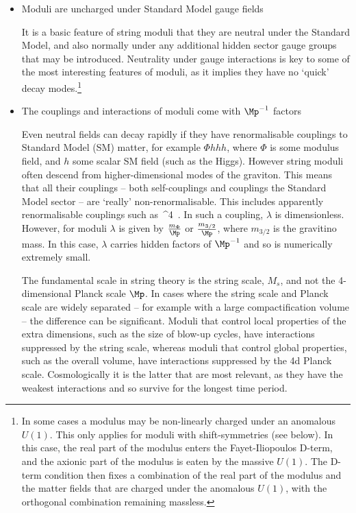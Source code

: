 \begin{itemize}

\item{Moduli are uncharged under Standard Model gauge fields}

It is a basic feature of string moduli that they are neutral under the Standard Model, and also normally under
any additional hidden sector gauge groups that may be introduced. Neutrality under gauge interactions is key to some of the most interesting
features of moduli, as it implies they have no `quick' decay modes.\footnote{In some cases a modulus may be non-linearly charged under an anomalous $U(1)$. This only applies for moduli with shift-symmetries (see below). In this case, the real part of the modulus enters the Fayet-Iliopoulos D-term, and the
axionic part of the modulus is eaten by the massive $U(1)$. The D-term condition then fixes a combination of the real part of the modulus
and the matter fields that are charged under the anomalous $U(1)$, with the orthogonal combination remaining massless.}

\item{The couplings and interactions of moduli come with $\Mp^{-1}$ factors}

Even neutral fields can decay rapidly if they have renormalisable couplings to Standard Model (SM) matter, for example $\Phi h h h$, where $\Phi$ is some modulus field, and $h$ some scalar SM field (such as the Higgs).
However string moduli often descend from higher-dimensional modes of the graviton. This means that all their couplings -- both self-couplings and
couplings the Standard Model sector -- are `really' non-renormalisable.
This includes apparently renormalisable couplings such as
\be
\lambda \,\Phi^4 \in {}\,.
\ee
In such a coupling, $\lambda$ is dimensionless. However, for moduli $\lambda$ is given by $\frac{m_{\Phi}}{\Mp}$ or $\frac{m_{3/2}}{\Mp}$, where $m_{3/2}$ is the gravitino mass. In this case, $\lambda$ carries hidden factors of $\Mp^{-1}$ and so is numerically extremely small.

The fundamental scale in string theory is the string scale, $M_s$, and not the 4-dimensional Planck scale $\Mp$. In cases
where the string scale and Planck scale are widely separated -- for example with a large compactification volume -- the difference can be significant. Moduli that control local properties of the extra dimensions, such as the size of blow-up cycles, have interactions suppressed by 
the string scale, whereas moduli that control global properties, such as the overall volume, have interactions suppressed by the 4d Planck scale.
Cosmologically it is the latter that are most relevant, as they have the weakest interactions and so survive for the longest time period.


\end{itemize}
